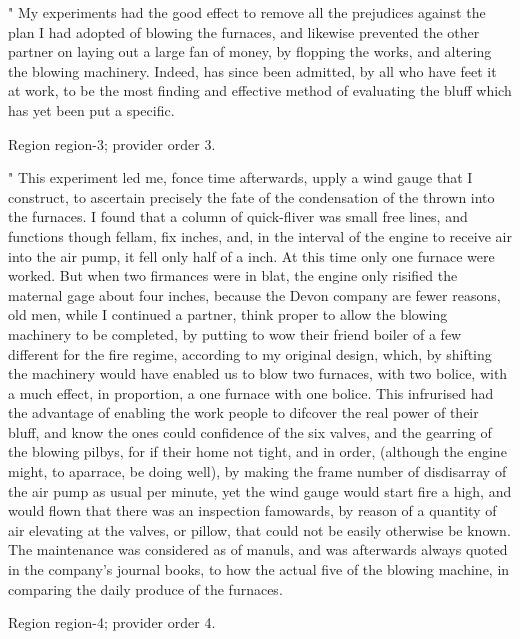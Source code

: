 \documentclass[11pt]{article}
\begin{document}
" My experiments had the good effect to remove all the prejudices against the plan I had adopted of blowing the furnaces, and likewise prevented the other partner on laying out a large fan of money, by flopping the works, and altering the blowing machinery. Indeed, has since been admitted, by all who have feet it at work, to be the most finding and effective method of evaluating the bluff which has yet been put a specific.
\par

{\scriptsize\color{gray} Region region-3; provider order 3.\par}
\medskip

" This experiment led me, fonce time afterwards, upply a wind gauge that I construct, to ascertain precisely the fate of the condensation of the thrown into the furnaces. I found that a column of quick-fliver was small free lines, and functions though fellam, fix inches, and, in the interval of the engine to receive air into the air pump, it fell only half of a inch. At this time only one furnace were worked. But when two firmances were in blat, the engine only risified the maternal gage about four inches, because the Devon company are fewer reasons, old men, while I continued a partner, think proper to allow the blowing machinery to be completed, by putting to wow their friend boiler of a few different for the fire regime, according to my original design, which, by shifting the machinery would have enabled us to blow two furnaces, with two bolice, with a much effect, in proportion, a one furnace with one bolice. This infrurised had the advantage of enabling the work people to difcover the real power of their bluff, and know the ones could confidence of the six valves, and the gearring of the blowing pilbys, for if their home not tight, and in order, (although the engine might, to aparrace, be doing well), by making the frame number of disdisarray of the air pump as usual per minute, yet the wind gauge would start fire a high, and would flown that there was an inspection famowards, by reason of a quantity of air elevating at the valves, or pillow, that could not be easily otherwise be known. The maintenance was considered as of manuls, and was afterwards always quoted in the company’s journal books, to how the actual five of the blowing machine, in comparing the daily produce of the furnaces.
\par

{\scriptsize\color{gray} Region region-4; provider order 4.\par}
\medskip
\end{document}
